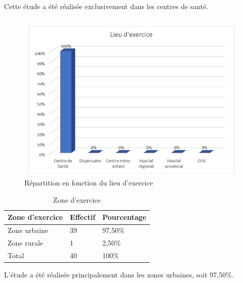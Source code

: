 \noindent Cette étude a été réalisée exclusivement dans les centres de santé. 

\begin{figure}[H]
  \centering
  \includegraphics[scale=1.2]{Images/fig_46.jpg}
  \caption{Répartition en fonction du lieu d’exercice}
  
\end{figure}

\begin{table}[H]
  \centering
  \renewcommand{\arraystretch}{1.5}
  \caption{Zone d’exercice}
  \begin{spacing}{1.5} %
  \begin{tabularx}{\textwidth}{|X|X|X|}
      \hline
      \rowcolor{customcolor!90}
      \textbf{\color{white}Zone d’exercice} & \textbf{\color{white}Effectif} & \textbf{\color{white}Pourcentage}  \\
      \hline
      Zone urbaine & 39 & 97,50\% \\
      \hline
      Zone rurale & 1 & 2,50\% \\
     \hline
      Total & 40 & 100\% \\
      \hline
  \end{tabularx}
\end{spacing}

\end{table}

\noindent L’étude a été réalisée principalement dans les zones urbaines, soit 97,50\%. 

